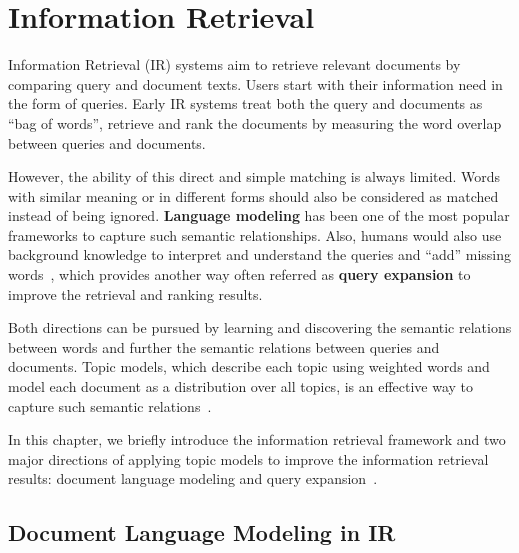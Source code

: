 \chapter{Information Retrieval}
\label{ch:ir}

Information Retrieval (IR) systems aim to retrieve relevant documents by comparing query and document texts. Users start with their information need in the form of queries. Early IR systems treat both the query and documents as ``bag of words'', retrieve and rank the documents by measuring the word overlap between queries and documents.


However, the ability of this direct and simple matching is always limited. Words with similar meaning or in different forms should also be considered as matched instead of being ignored. \textbf{Language modeling} has been one of the most popular frameworks to capture such semantic relationships. Also, humans would also use background knowledge to interpret and understand the queries and ``add'' missing words~\citep{wei-07}, which provides another way often referred as \textbf{query expansion} to improve the retrieval and ranking results.

Both directions can be pursued by learning and discovering the semantic relations between words and further the semantic relations between queries and documents. Topic models, which describe each topic using weighted words and model each document as a distribution over all topics, is an effective way  to capture such semantic relations~\citep{deerwester-90,hofmann-99a}.

In this chapter, we briefly introduce the information retrieval framework and two major directions of applying topic models to improve the information retrieval results: document language modeling \citep{Lu-2011,wei-06} and query expansion~\citep{Park-2009,Andrzejewski-2011}.

\section{Document Language Modeling in IR}

